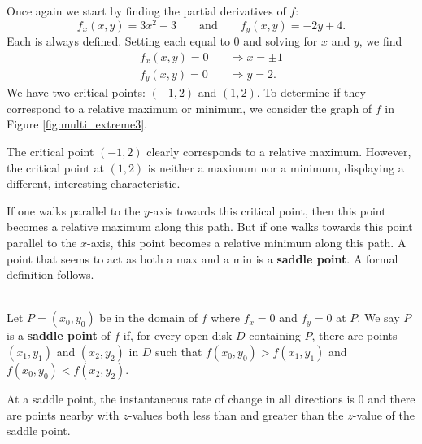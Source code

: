 {Once again we start by finding the partial derivatives of $f$:
$$f_x(x,y) = 3x^2-3\qquad \text{and} \qquad f_y(x,y) = -2y+4.$$
Each is always defined. Setting each equal to 0 and solving for $x$ and $y$, we find
\begin{align*}
f_x(x,y) = 0 \quad &\Rightarrow x=\pm 1\\
f_y(x,y) = 0\quad &\Rightarrow y = 2.
\end{align*}
We have two critical points: $(-1,2)$ and $(1,2)$. To determine if they correspond to a relative maximum or minimum, we consider the graph of $f$ in Figure \ref{fig:multi_extreme3}.

The critical point $(-1,2)$ clearly corresponds to a relative maximum. However, the critical point at $(1,2)$ is neither a maximum nor a minimum, displaying a different, interesting characteristic. 

If one walks parallel to the $y$-axis towards this critical point, then this point becomes a relative maximum along this path. But if one walks towards this point parallel to the $x$-axis, this point becomes a relative minimum along this path. A point that seems to act as both a max and a min is a \textbf{saddle point}. A formal definition follows.
}\\

{Let $P=(x_0,y_0)$ be in the domain of $f$ where $f_x=0$ and $f_y=0$ at $P$. We say $P$ is a \textbf{saddle point} of $f$ if, for every open disk $D$ containing $P$, there are points $(x_1,y_1)$ and $(x_2,y_2)$ in $D$ such that $f(x_0,y_0)>f(x_1,y_1)$ and $f(x_0,y_0)<f(x_2,y_2)$.
}

At a saddle point, the instantaneous rate of change in all directions is 0 and there are points nearby with $z$-values both less than and greater than the $z$-value of the saddle point.


